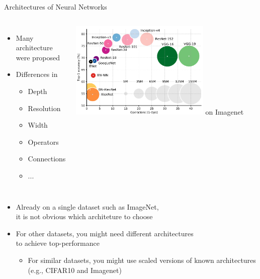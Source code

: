 \begin{frame}[c]{Architectures of Neural Networks}

\begin{columns}
	
	\begin{itemize}
		\item Many architecture were proposed
		\item Differences in 
		\begin{itemize}
			\item Depth
			\item Resolution
			\item Width
			\item Operators
			\item Connections
			\item ...
		\end{itemize}
	\end{itemize}
	
	
	\centering
	\includegraphics[width=0.7\textwidth]{images/overview_achitecture_perf.PNG}\newline
	on Imagenet~
	
\end{columns}

\pause
\begin{itemize}
	\item Already on a single dataset such as ImageNet,\\ it is not obvious which architeture to choose
	\pause
	\item For other datasets, you might need different architectures\\ to achieve top-performance
	
	\pause
	\begin{itemize}
		\item For similar datasets, you might use scaled versions of known architectures (e.g., CIFAR10 and Imagenet)
	\end{itemize}
\end{itemize}

\end{frame}
